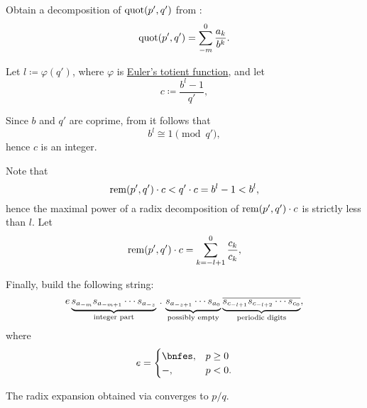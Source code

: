 \begin{algorithm}
\begin{thmenum}
     Obtain a decomposition of \( \operatorname{quot}(p', q') \) from :
    \begin{equation}\label{eq:alg:rational_number_to_positional_string/int}
      \operatorname{quot}(p', q') = \sum_{-m}^0 \frac {a_k} {b^k}.
    \end{equation}

     Let \( l \coloneqq \varphi(q') \), where \( \varphi \) is \hyperref[def:eulers_totient_function]{Euler's totient function}, and let
    \begin{equation}\label{eq:alg:rational_number_to_positional_string/periodic/c}
      c \coloneqq \frac {b^l - 1} {q'},
    \end{equation}

    Since \( b \) and \( q' \) are coprime, from  it follows that
    \begin{equation*}
      b^l \cong 1 \pmod {q'},
    \end{equation*}
    hence \( c \) is an integer.

    Note that
    \begin{equation}\label{eq:alg:rational_number_to_positional_string/periodic/digit_inequality}
      \operatorname{rem}(p', q') \cdot c < q' \cdot c = b^l - 1 < b^l,
    \end{equation}
    hence the maximal power of a radix decomposition of \( \operatorname{rem}(p', q') \cdot c \) is strictly less than \( l \). Let
    \begin{equation}\label{eq:alg:rational_number_to_positional_string/periodic}
      \operatorname{rem}(p', q') \cdot c = \sum_{k={-l+1}}^0 \frac {c_k} {c_k},
    \end{equation}

     Finally, build the following string:
    \begin{equation}\label{eq:alg:rational_number_to_positional_string/string}
      e \underbrace{s_{a_{-m}} s_{a_{-m+1}} \cdots s_{a_{-z}}}_{\T{integer part}} \thinspace . \thinspace \underbrace{s_{a_{-z+1}} \cdots s_{a_0}}_{\T{possibly empty}} \underbrace{\oline{s_{c_{-l+1}} s_{c_{-l+2}} \cdots s_{c_0}}}_{\T{periodic digits}},
    \end{equation}
    where
    \begin{equation*}
      e = \begin{cases}
        \bnfes, &p \geq 0 \\
        -,      &p < 0.
      \end{cases}
    \end{equation*}

    The radix expansion obtained via  converges to \( p / q \).
  \end{thmenum}
\end{algorithm}
